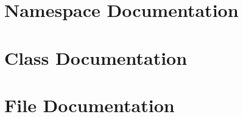 \documentclass[twoside]{book}
\newcommand{\+}{\discretionary{\mbox{\scriptsize$\hookleftarrow$}}{}{}}
\newcommand{\clearemptydoublepage}{%
    \newpage{\pagestyle{empty}\cleardoublepage}%
  }
\begin{document}
\chapter{Namespace Documentation}

\chapter{Class Documentation}


\chapter{File Documentation}
















  \backmatter
  \newpage
  \clearemptydoublepage
  \printindex
\end{document}
